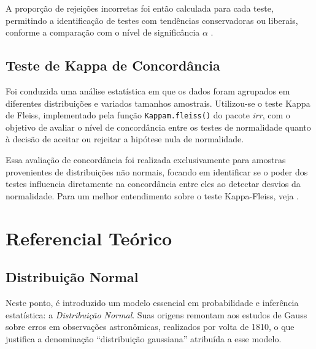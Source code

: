 \documentclass[a4paper,11pt]{article} %
\begin{document}
\vskip0.3cm

A proporção de rejeições incorretas foi então calculada para cada teste, permitindo a identificação de testes com tendências conservadoras ou liberais, conforme a comparação com o nível de significância $\alpha$ \cite{carradori2014avaliaccao}.

\subsection{Teste de Kappa de Concordância} %

Foi conduzida uma análise estatística em que os dados foram agrupados em diferentes distribuições e variados tamanhos amostrais. Utilizou-se o teste Kappa de Fleiss, implementado pela função \texttt{Kappam.fleiss()} do pacote \textit{irr}, com o objetivo de avaliar o nível de concordância entre os testes de normalidade quanto à decisão de aceitar ou rejeitar a hipótese nula de normalidade.

\vskip0.3cm

Essa avaliação de concordância foi realizada exclusivamente para amostras provenientes de distribuições não normais, focando em identificar se o poder dos testes influencia diretamente na concordância entre eles ao detectar desvios da normalidade. Para um melhor entendimento sobre o teste Kappa-Fleiss, veja \cite{fleiss1971measuring, conger1980integration, fleiss2003statistical}.

\section{Referencial Teórico} %

\subsection{Distribuição Normal} %

Neste ponto, é introduzido um modelo essencial em probabilidade e inferência estatística: a \textit{Distribuição Normal}. Suas origens remontam aos estudos de Gauss sobre erros em observações astronômicas, realizados por volta de 1810, o que justifica a denominação “distribuição gaussiana” atribuída a esse modelo.

\vskip0.3cm
\end{document}
